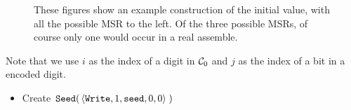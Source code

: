 \begin{figure}[H]
    \caption{\label{fig:initial_value_assemblies} These figures show an example construction of the initial value,
    with all the possible MSR to the left. Of the three possible MSRs, of course only one would occur in a real assemble.}
\end{figure}

Note that we use $i$ as the index of a digit in $\mathcal{C}_0$ and $j$ as the index of a bit
in a encoded digit.

\begin{itemize}
    \item Create
    $\begin{aligned}[t]
        {\tt Seed}(&\left\langle {\tt Write}, 1, {\tt seed}, 0, 0 \right\rangle \; )
    \end{aligned}$
\end{itemize}


